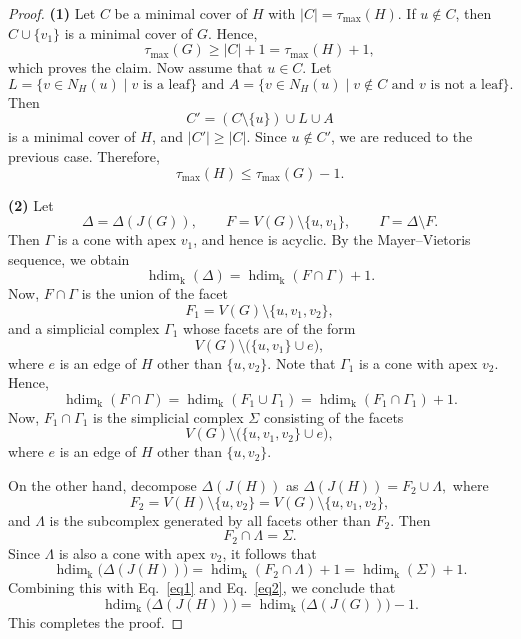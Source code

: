 \documentclass[12pt,amscd]{amsart}
\theoremstyle{definition}
\DeclareMathOperator{\hdim}{hdim}
\def\k {\mathrm k}
\begin{document}
\begin{proof}
\textbf{(1)} Let $C$ be a minimal cover of $H$ with $|C| = \tau_{\max}(H)$. If $u \notin C$, then $C \cup \{v_1\}$ is a minimal cover of $G$. Hence,
\[
\tau_{\max}(G) \ge |C| + 1 = \tau_{\max}(H) + 1,
\]
which proves the claim. Now assume that $u \in C$. Let
\[
L = \{v \in N_H(u) \mid v \text{ is a leaf}\}
 \text{ and } 
A = \{v \in N_H(u) \mid v \notin C \text{ and } v \text{ is not a leaf}\}.
\]
Then
\[
C' = (C \setminus \{u\}) \cup L \cup A
\]
is a minimal cover of $H$, and \(|C'| \ge |C|.\) Since $u \notin C'$, we are reduced to the previous case. Therefore,
\[
\tau_{\max}(H) \le \tau_{\max}(G) - 1.
\]

\medskip

\textbf{(2)} Let
\[
\Delta = \Delta(J(G)),
\qquad
F = V(G) \setminus \{u,v_1\},
\qquad
\Gamma = \Delta \setminus F.
\]
Then $\Gamma$ is a cone with apex $v_1$, and hence is acyclic. By the Mayer--Vietoris sequence, we obtain
\begin{equation}\label{eq1}
\hdim_{\k}(\Delta)
=
\hdim_{\k}(F \cap \Gamma) + 1.
\end{equation}
Now, $F \cap \Gamma$ is the union of the facet
\[
F_1 = V(G) \setminus \{u,v_1,v_2\},
\]
and a simplicial complex $\Gamma_1$ whose facets are of the form
\[
V(G) \setminus \bigl(\{u,v_1\} \cup e\bigr),
\]
where $e$ is an edge of $H$ other than $\{u,v_2\}$. Note that $\Gamma_1$ is a cone with apex $v_2$. Hence,
\begin{equation}\label{eq2}
\hdim_\k (F \cap \Gamma) = \hdim_{\k}(F_1 \cup \Gamma_1)
=
\hdim_{\k}(F_1 \cap \Gamma_1) + 1.
\end{equation}
Now, $F_1 \cap \Gamma_1$ is the simplicial complex $\Sigma$ consisting of the facets
\[
V(G) \setminus \bigl(\{u,v_1,v_2\} \cup e\bigr),
\]
where $e$ is an edge of $H$ other than $\{u,v_2\}$.

On the other hand, decompose $\Delta(J(H))$ as \( \Delta(J(H)) = F_2 \cup \Lambda,\) where
\[
F_2 = V(H) \setminus \{u,v_2\}
     = V(G) \setminus \{u,v_1,v_2\},
\]
and $\Lambda$ is the subcomplex generated by all facets other than $F_2$. Then
\[
F_2 \cap \Lambda = \Sigma.
\]
Since $\Lambda$ is also a cone with apex $v_2$, it follows that
\[
\hdim_{\k}\bigl(\Delta(J(H))\bigr)
=
\hdim_{\k}(F_2 \cap \Lambda) + 1
=
\hdim_{\k}(\Sigma) + 1.
\]
Combining this with Eq.~\eqref{eq1} and Eq.~\eqref{eq2}, we conclude that
\[
\hdim_{\k}\bigl(\Delta(J(H))\bigr)
=
\hdim_{\k}\bigl(\Delta(J(G))\bigr) - 1.
\]
This completes the proof.
\end{proof}
\end{document}
